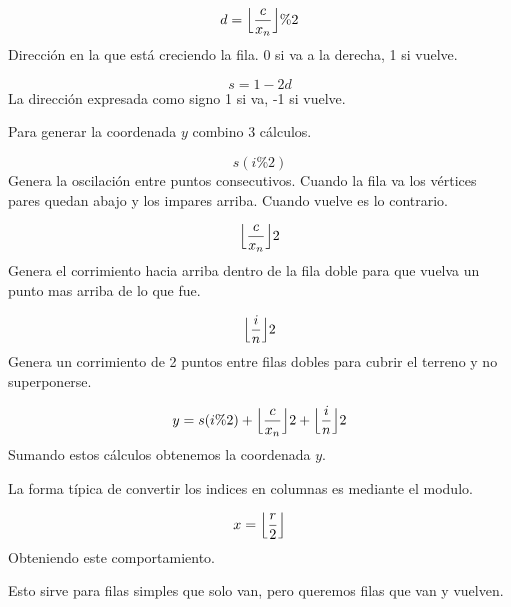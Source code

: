 \documentclass{article}
\begin{document}
\begin{equation*}
	d = \Bigl\lfloor \frac{c}{x_n} \Bigr\rfloor\%2
\end{equation*}
Dirección en la que está creciendo la fila. 0 si va  a la derecha, 1 si vuelve.

\begin{equation*}
	s = 1-2d
\end{equation*}
La dirección expresada como signo 1 si va, -1 si vuelve.

\vspace{0.5cm}

Para generar la coordenada $y$ combino 3 cálculos.

\begin{equation*}
    s(i\%2)
\end{equation*}
Genera la oscilación entre puntos consecutivos. Cuando la fila va los vértices pares 
quedan abajo y los impares arriba. Cuando vuelve es lo contrario.

\begin{equation*}
    \Bigl\lfloor \frac{c}{x_n} \Bigr\rfloor 2
\end{equation*}
Genera el corrimiento hacia arriba dentro de la fila doble para que vuelva un punto mas
arriba de lo que fue.

\begin{equation*}
	\Bigl\lfloor \frac{i}{n} \Bigr\rfloor 2
\end{equation*}
Genera un corrimiento de 2 puntos entre filas dobles para cubrir el terreno y no 
superponerse.

\begin{equation*}
    y = s(i\%2) +
	 \Bigl\lfloor \frac{c}{x_n} \Bigr\rfloor 2 +
	 \Bigl\lfloor \frac{i}{n} \Bigr\rfloor 2
\end{equation*}
Sumando estos cálculos obtenemos la coordenada $y$.

\vspace{0.5cm}

La forma típica de convertir los indices en columnas es mediante el modulo. 

\begin{equation*}
    x =  \Bigl\lfloor \frac{r}{2} \Bigr\rfloor
\end{equation*}
Obteniendo este comportamiento.
\begin{figure}[h]
\end{figure}
Esto sirve para filas simples que solo van, pero queremos filas que van y vuelven.
\end{document}
